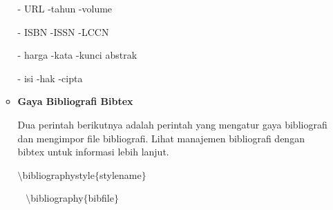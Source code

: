\begin{itemize}
\begin{itemize}
\hspace*{0.5in}- URL \hspace*{0.5in}\hspace*{0.5in}\hspace*{0.5in}-tahun \hspace*{0.5in}\hspace*{0.5in}\hspace*{0.5in}-volume\par

\hspace*{0.5in}- ISBN \hspace*{0.5in}\hspace*{0.5in}-ISSN \hspace*{0.5in}\hspace*{0.5in}\hspace*{0.5in}-LCCN\par

\hspace*{0.5in}- harga \hspace*{0.5in}\hspace*{0.5in}-kata \hspace*{0.5in}\hspace*{0.5in}\hspace*{0.5in}-kunci abstrak\par

\hspace*{0.5in}- isi \hspace*{0.5in}\hspace*{0.5in}\hspace*{0.5in}-hak \hspace*{0.5in}\hspace*{0.5in}\hspace*{0.5in}-cipta\par

	\item {\fontsize{14pt}{14pt}\selectfont \textbf{Gaya Bibliografi Bibtex}}\par

Dua perintah berikutnya adalah perintah yang mengatur gaya bibliografi dan mengimpor file bibliografi. Lihat manajemen bibliografi dengan bibtex untuk informasi lebih lanjut. \par

$\setminus$bibliographystyle$ \{ $stylename$ \} $\par

~ \hspace*{0.5in}$\setminus$bibliography$ \{ $bibfile$ \} $\par


\end{itemize}
\end{itemize}
